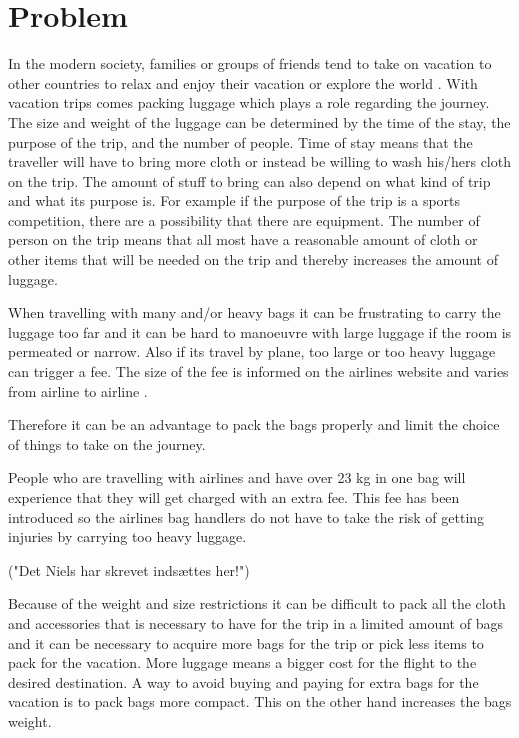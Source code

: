 \section{Problem}
In the modern society, families or groups of friends tend to take on vacation to other countries to relax and enjoy their vacation or explore the world \citep{danskecharter}.
With vacation trips comes packing luggage which plays a role regarding the journey. The size and weight of the luggage can be determined by the time of the stay, the purpose of the trip, and the number of people.
Time of stay means that the traveller will have to bring more cloth or instead be willing to wash his/hers cloth on the trip.
The amount of stuff to bring can also depend on what kind of trip and what its purpose is. For example if the purpose of the trip is a sports competition, there are a possibility that there are equipment.
The number of person on the trip means that all most have a reasonable amount of cloth or other items that will be needed on the trip and thereby increases the amount of luggage.

When travelling with many and/or heavy bags it can be frustrating to carry the luggage too far and it can be hard to manoeuvre with large luggage if the room is permeated or narrow. Also if its travel by plane, too large or too heavy luggage can trigger a fee. The size of the fee is informed on the airlines website and varies from airline to airline \citep{altombag}.

Therefore it can be an advantage to pack the bags properly and limit the choice of things to take on the journey.

People who are travelling with airlines and have over 23 kg in one bag will experience that they will get charged with an extra fee. This fee has been introduced so the airlines bag handlers do not have to take the risk of getting injuries by carrying too heavy luggage.

("Det Niels har skrevet indsættes her!")

Because of the weight and size restrictions it can be difficult to pack all the cloth and accessories that is necessary to have for the trip in a limited amount of bags and it can be necessary to acquire more bags for the trip or pick less items to pack for the vacation. More luggage means a bigger cost for the flight to the desired destination. A way to avoid buying and paying for extra bags for the vacation is to pack bags more compact. This on the other hand increases the bags weight\citep{altombag}.

